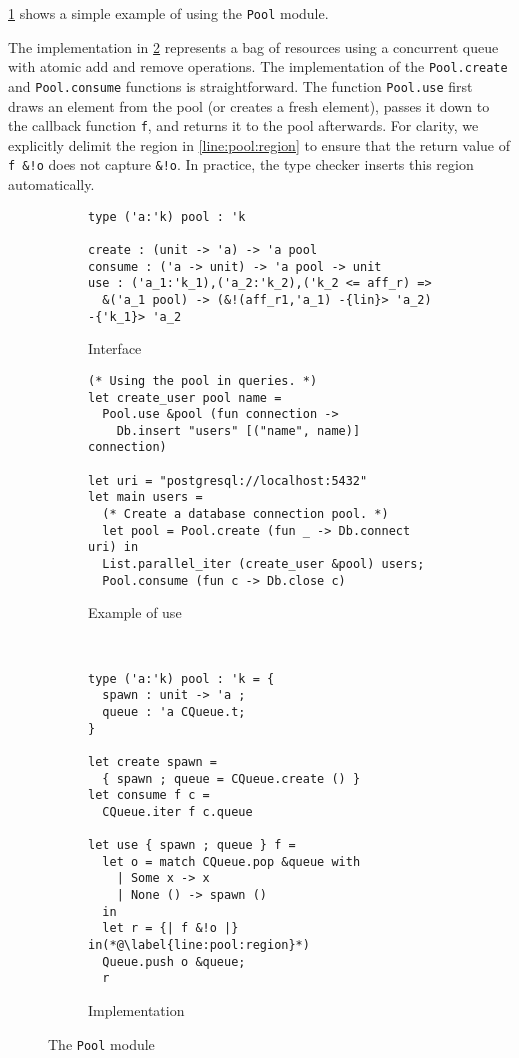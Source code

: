 \cref{ex:pool} shows a simple example of using the \lstinline/Pool/ module.

The implementation in \cref{impl:pool} represents a bag of resources
using a concurrent queue with atomic add and remove operations. 
The implementation of the \lstinline/Pool.create/ and \lstinline/Pool.consume/
functions is straightforward.
The function \lstinline/Pool.use/ first draws
an element from the pool (or creates a fresh element),
passes it down to the callback function \lstinline/f/, and returns
it to the pool afterwards.
For clarity,
we explicitly delimit the region in \cref{line:pool:region} to ensure that
the return value of \lstinline/f &!o/ does not capture \lstinline/&!o/.
In practice, the type checker inserts this region automatically.

\begin{figure}[tp]
  \centering
  \begin{subfigure}[t]{.58\linewidth}
\begin{lstlisting}
type ('a:'k) pool : 'k

create : (unit -> 'a) -> 'a pool
consume : ('a -> unit) -> 'a pool -> unit
use : ('a_1:'k_1),('a_2:'k_2),('k_2 <= aff_r) =>
  &('a_1 pool) -> (&!(aff_r1,'a_1) -{lin}> 'a_2) -{'k_1}> 'a_2
\end{lstlisting}
    \caption{Interface}
    \label{intf:pool}

\begin{lstlisting}
(* Using the pool in queries. *)
let create_user pool name =
  Pool.use &pool (fun connection ->
    Db.insert "users" [("name", name)] connection)
 
let uri = "postgresql://localhost:5432"
let main users =
  (* Create a database connection pool. *)
  let pool = Pool.create (fun _ -> Db.connect uri) in
  List.parallel_iter (create_user &pool) users;
  Pool.consume (fun c -> Db.close c)
\end{lstlisting}
    \caption{Example of use}
    \label{ex:pool}
  \end{subfigure}~
  \begin{subfigure}[t]{.43\linewidth}
\begin{lstlisting}
type ('a:'k) pool : 'k = {
  spawn : unit -> 'a ;
  queue : 'a CQueue.t;
}

let create spawn =
  { spawn ; queue = CQueue.create () }
let consume f c =
  CQueue.iter f c.queue

let use { spawn ; queue } f =
  let o = match CQueue.pop &queue with
    | Some x -> x
    | None () -> spawn ()
  in
  let r = {| f &!o |} in(*@\label{line:pool:region}*)
  Queue.push o &queue;
  r
\end{lstlisting}
    \caption{Implementation}
    \label{impl:pool}
  \end{subfigure}

  \caption{The \texttt{Pool} module}
  \label{fig:pool}
\end{figure}


